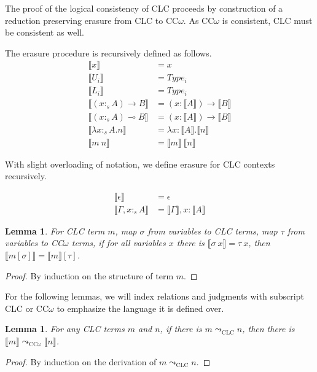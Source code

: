 \documentclass{article}
\newtheorem{lemma}[theorem]{Lemma}
\theoremstyle{definition}
\newcommand{\stype}[1]{:_{#1}}
\newcommand{\step}{\leadsto}
\newcommand{\erase}[1]{\llbracket #1 \rrbracket}
\begin{document}
The proof of the logical consistency of CLC proceeds by construction of a reduction preserving erasure from CLC to CC$\omega$. As CC$\omega$ is consistent, CLC must be consistent as well.

The erasure procedure is recursively defined as follows.
\begin{align*}
  \erase{x}                             & = x                                     \\
  \erase{U_i}                           & = Type_i                                \\
  \erase{L_i}                           & = Type_i                                \\
  \erase{(x \stype{s} A) \rightarrow B} & = (x : \erase{A}) \rightarrow \erase{B} \\
  \erase{(x \stype{s} A) \multimap B}   & = (x : \erase{A}) \rightarrow \erase{B} \\
  \erase{\lambda x\stype{s}A.n}         & = \lambda x : \erase{A}.\erase{n}       \\
  \erase{m\ n}                          & = \erase{m}\ \erase{n}
\end{align*}

With slight overloading of notation, we define erasure for CLC contexts recursively.

\begin{align*}
  \erase{\epsilon}              & = \epsilon                      \\
  \erase{\Gamma, x \stype{s} A} & = \erase{\Gamma}, x : \erase{A}
\end{align*}

\begin{lemma}
  For CLC term $m$, map $\sigma$ from variables to CLC terms, map $\tau$ from variables to CC$\omega$ terms, if for all variables $x$ there is $\erase{\sigma\ x} = \tau\ x$, then $\erase{m[\sigma]} = \erase{m}[\tau]$.
\end{lemma}
\begin{proof}
  By induction on the structure of term $m$.
\end{proof}

For the following lemmas, we will index relations and judgments with subscript CLC or CC$\omega$ to emphasize the language it is defined over.

\begin{lemma}\label{erasestep}
  For any CLC terms $m$ and $n$, if there is $m \step_{\scriptscriptstyle \text{CLC}} n$, then there is $\erase{m} \step_{\scriptscriptstyle \text{CC$\omega$}} \erase{n}$.
\end{lemma}
\begin{proof}
  By induction on the derivation of $m \step_{\scriptscriptstyle \text{CLC}} n$.
\end{proof}
\end{document}
